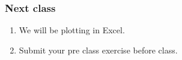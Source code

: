 \documentclass[11pt]{beamer}
\begin{document}
%
%

\begin{frame}
 \frametitle{Next class}
\begin{enumerate}
\item We will be plotting in Excel.
\item Submit your pre class exercise before class.
\end{enumerate}
\end{frame}
\end{document}

